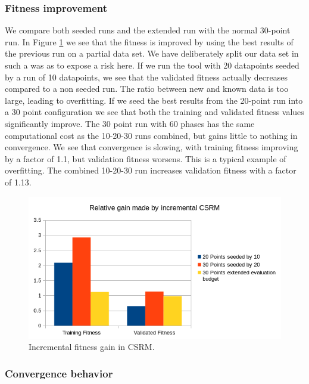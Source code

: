 \subsubsection{Fitness improvement}
We compare both seeded runs and the extended run with the normal 30-point run. In Figure \ref{fig:incrementalgain} we see that the fitness is improved by using the best results of the previous run on a partial data set. We have deliberately split our data set in such a was as to expose a risk here. If we run the tool with 20 datapoints seeded by a run of 10 datapoints, we see that the validated fitness actually decreases compared to a non seeded run. The ratio between new and known data is too large, leading to overfitting. If we seed the best results from the 20-point run into a 30 point configuration we see that both the training and validated fitness values significantly improve. 
The 30 point run with 60 phases has the same computational cost as the 10-20-30 runs combined, but gains little to nothing in convergence. We see that convergence is slowing, with training fitness improving by a factor of 1.1, but validation fitness worsens. This is a typical example of overfitting. The combined 10-20-30 run increases validation fitness with a factor of 1.13.
\begin{figure}
    \centering
    \includegraphics[width=\textwidth,height=\textheight,keepaspectratio]{figures/incrementalgain.png}
    \caption{Incremental fitness gain in CSRM.}
    \label{fig:incrementalgain}
\end{figure}
\subsubsection{Convergence behavior}
